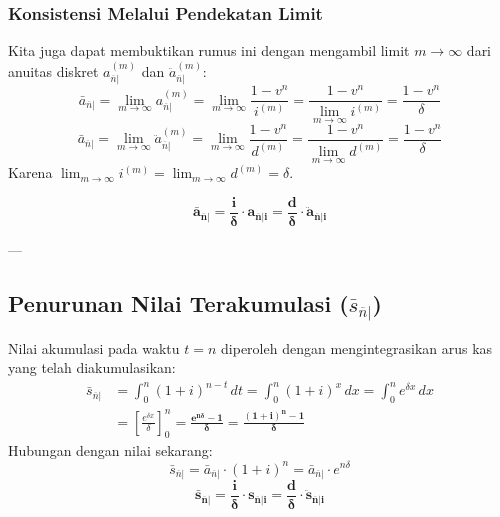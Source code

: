 \documentclass[11pt,a4paper]{article}
\begin{document}
\subsubsection{Konsistensi Melalui Pendekatan Limit}
Kita juga dapat membuktikan rumus ini dengan mengambil limit $m \to \infty$ dari anuitas diskret $a_{\overline{n}|}^{(m)}$ dan $\ddot{a}_{\overline{n}|}^{(m)}$:
\begin{equation}
    \bar{a}_{\overline{n}|} = \lim_{m \to \infty} a_{\overline{n}|}^{(m)} = \lim_{m \to \infty} \frac{1 - v^n}{i^{(m)}} = \frac{1 - v^n}{\lim_{m \to \infty} i^{(m)}} = \frac{1 - v^n}{\delta}
\end{equation}
\begin{equation}
    \bar{a}_{\overline{n}|} = \lim_{m \to \infty} \ddot{a}_{\overline{n}|}^{(m)} = \lim_{m \to \infty} \frac{1 - v^n}{d^{(m)}} = \frac{1 - v^n}{\lim_{m \to \infty} d^{(m)}} = \frac{1 - v^n}{\delta}
\end{equation}
Karena $\lim_{m \to \infty} i^{(m)} = \lim_{m \to \infty} d^{(m)} = \delta$.

\begin{definitionbox}
\begin{equation}
    \mathbf{\bar{a}_{\overline{n}|} = \frac{i}{\delta} \cdot a_{\overline{n}|i} = \frac{d}{\delta} \cdot \ddot{a}_{\overline{n}|i}}
\end{equation}
\end{definitionbox}

---

\subsection{Penurunan Nilai Terakumulasi (\texorpdfstring{$\bar{s}_{\overline{n}|}$}{s\_bar\_n|})}

Nilai akumulasi pada waktu $t = n$ diperoleh dengan mengintegrasikan arus kas yang telah diakumulasikan:
\begin{align}
    \bar{s}_{\overline{n}|} &= \int_{0}^{n} (1+i)^{n-t} \, dt = \int_{0}^{n} (1+i)^x \, dx = \int_{0}^{n} e^{\delta x} \, dx \nonumber\\[0.4em]
    &= \left[ \frac{e^{\delta x}}{\delta} \right]_{0}^{n} = \mathbf{\frac{e^{n\delta} - 1}{\delta} = \frac{(1+i)^n - 1}{\delta}}
\end{align}
Hubungan dengan nilai sekarang:
\begin{equation}
    \bar{s}_{\overline{n}|} = \bar{a}_{\overline{n}|} \cdot (1+i)^n = \bar{a}_{\overline{n}|} \cdot e^{n\delta}
\end{equation}
\begin{equation}
    \mathbf{\bar{s}_{\overline{n}|} = \frac{i}{\delta} \cdot s_{\overline{n}|i} = \frac{d}{\delta} \cdot \ddot{s}_{\overline{n}|i}}
\end{equation}
\end{document}
